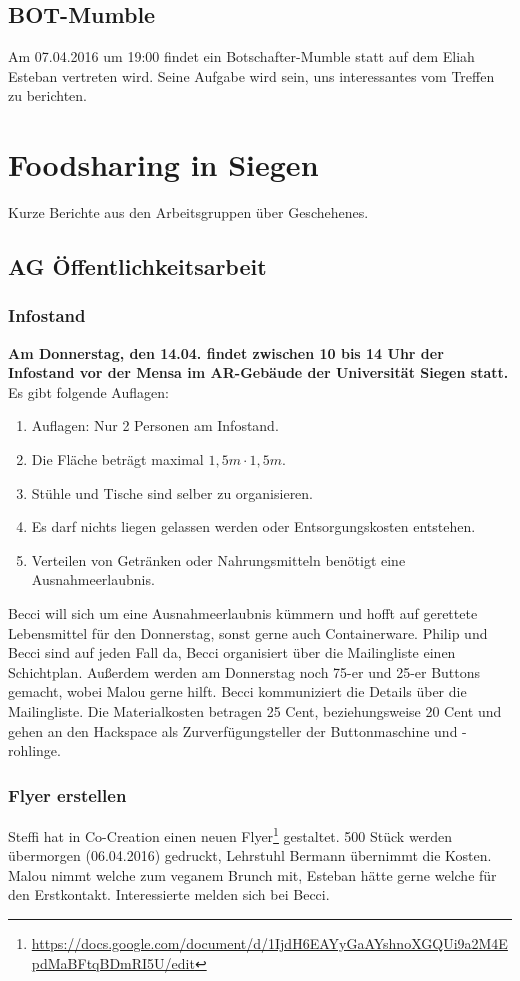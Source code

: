 \documentclass{scrreprt}
\begin{document}
\section{BOT-Mumble}
Am 07.04.2016 um 19:00 findet ein Botschafter-Mumble statt auf dem Eliah Esteban vertreten wird. Seine Aufgabe wird sein, uns interessantes vom Treffen zu berichten.
\chapter{Foodsharing in Siegen}
Kurze Berichte aus den Arbeitsgruppen über Geschehenes.
\section{AG Öffentlichkeitsarbeit}
\subsection{Infostand}
\textbf{Am Donnerstag, den 14.04. findet zwischen 10 bis 14 Uhr der Infostand vor der Mensa im AR-Gebäude der Universität Siegen statt.} Es gibt folgende Auflagen: 
\begin{enumerate}
\item Auflagen: Nur 2 Personen am Infostand. 
\item Die Fläche beträgt maximal $ 1,5m \cdot 1,5m$. 
\item Stühle und Tische sind selber zu organisieren. 
\item Es darf nichts liegen gelassen werden oder Entsorgungskosten entstehen. 
\item Verteilen von Getränken oder Nahrungsmitteln benötigt eine Ausnahmeerlaubnis.
\end{enumerate} 
Becci will sich um eine Ausnahmeerlaubnis kümmern und hofft auf gerettete Lebensmittel für den Donnerstag, sonst gerne auch Containerware. Philip und Becci sind auf jeden Fall da, Becci organisiert über die Mailingliste einen Schichtplan. Außerdem werden am Donnerstag noch 75-er und 25-er Buttons gemacht, wobei Malou gerne hilft. Becci kommuniziert die Details über die Mailingliste. Die Materialkosten betragen 25 Cent, beziehungsweise 20 Cent und gehen an den Hackspace als Zurverfügungsteller der Buttonmaschine und -rohlinge.
\subsection{Flyer erstellen}
Steffi hat in Co-Creation einen neuen Flyer\footnote{\url{https://docs.google.com/document/d/1IjdH6EAYyGaAYshnoXGQUi9a2M4EpdMaBFtqBDmRI5U/edit}} gestaltet. 500 Stück werden übermorgen (06.04.2016) gedruckt, Lehrstuhl Bermann übernimmt die Kosten. Malou nimmt welche zum veganem Brunch mit, Esteban hätte gerne welche für den Erstkontakt. Interessierte melden sich bei Becci. 
\end{document}
